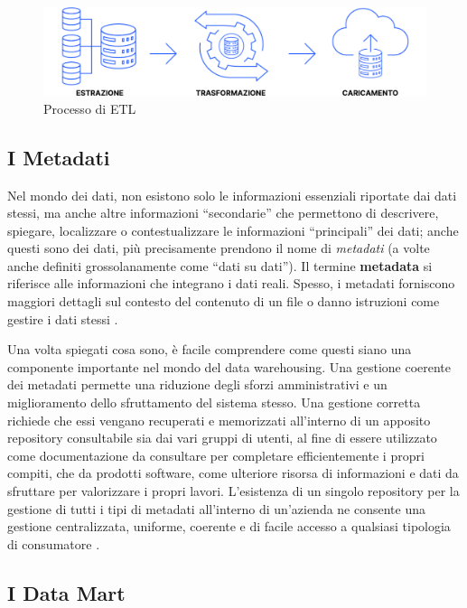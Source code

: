 \begin{figure}[H]
    \centering
    \includegraphics[width=1\linewidth]{figure/capitolo_2/ETL Process.pdf}
    \caption{Processo di ETL}
    \label{fig:ETL Process}
\end{figure}

\subsection{I Metadati}

Nel mondo dei dati, non esistono solo le informazioni essenziali riportate dai dati stessi, ma anche altre informazioni “secondarie” che permettono di descrivere, spiegare, localizzare o contestualizzare le informazioni “principali” dei dati; anche questi sono dei dati, più precisamente prendono il nome di \textit{metadati} (a volte anche definiti grossolanamente come “dati su dati”). Il termine \textbf{metadata} si riferisce alle informazioni che integrano i dati reali. Spesso, i metadati forniscono maggiori dettagli sul contesto del contenuto di un file o danno istruzioni come gestire i dati stessi \cite{ionos_metadata}.

Una volta spiegati cosa sono, è facile comprendere come questi siano una componente importante nel mondo del data warehousing. Una gestione coerente dei metadati permette una riduzione degli sforzi amministrativi e un miglioramento dello sfruttamento del sistema stesso. Una gestione corretta richiede che essi vengano recuperati e memorizzati all'interno di un apposito repository consultabile sia dai vari gruppi di utenti, al fine di essere utilizzato come documentazione da consultare per completare efficientemente i propri compiti, che da prodotti software, come ulteriore risorsa di informazioni e dati da sfruttare per valorizzare i propri lavori. L'esistenza di un singolo repository per la gestione di tutti i tipi di metadati all'interno di un'azienda ne consente una gestione centralizzata, uniforme, coerente e di facile accesso a qualsiasi tipologia di consumatore \cite{metadata_standards}.

\subsection{I Data Mart}

